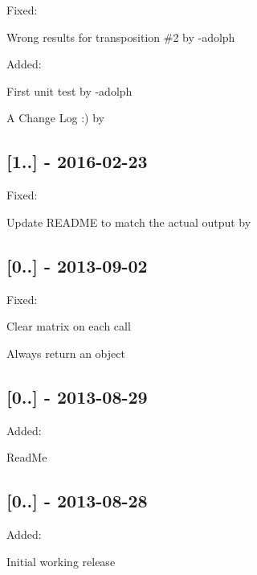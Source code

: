 Fixed\+:
\begin{DoxyItemize}
\item Wrong results for transposition \#2 by -\/adolph
\end{DoxyItemize}

Added\+:
\begin{DoxyItemize}
\item First unit test by -\/adolph
\item A Change Log \+:) by 
\end{DoxyItemize}

\subsection*{\mbox{[}1..\mbox{]} -\/ 2016-\/02-\/23}

Fixed\+:
\begin{DoxyItemize}
\item Update R\+E\+A\+D\+ME to match the actual output by 
\end{DoxyItemize}

\subsection*{\mbox{[}0..\mbox{]} -\/ 2013-\/09-\/02}

Fixed\+:
\begin{DoxyItemize}
\item Clear matrix on each call 
\item Always return an object 
\end{DoxyItemize}

\subsection*{\mbox{[}0..\mbox{]} -\/ 2013-\/08-\/29}

Added\+:
\begin{DoxyItemize}
\item Read\+Me
\end{DoxyItemize}

\subsection*{\mbox{[}0..\mbox{]} -\/ 2013-\/08-\/28}

Added\+:
\begin{DoxyItemize}
\item Initial working release  
\end{DoxyItemize}